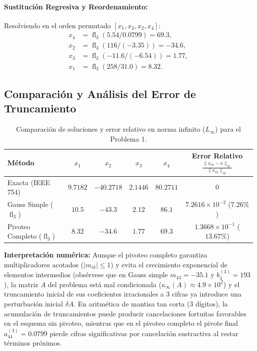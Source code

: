 \documentclass[11pt,letterpaper]{article}
\begin{document}
\paragraph{Sustitución Regresiva y Reordenamiento:}
Resolviendo en el orden permutado $[x_1, x_3, x_2, x_4]$:
\begin{align*}
    x_4 &= \operatorname{fl}_3(5.54 / 0.0799) = 69.3, \\
    x_2 &= \operatorname{fl}_3(116 / (-3.35)) = -34.6, \\
    x_3 &= \operatorname{fl}_3(-11.6 / (-6.54)) = 1.77, \\
    x_1 &= \operatorname{fl}_3(258 / 31.0) = 8.32.
\end{align*}

\subsection{Comparación y Análisis del Error de Truncamiento}

\begin{table}[H]
    \centering
    \caption{Comparación de soluciones y error relativo en norma infinito ($L_\infty$) para el Problema 1.}
    \label{tab:p1_comparacion}
    \begin{tabular}{lccccc}
        \toprule
        Método & $x_1$ & $x_2$ & $x_3$ & $x_4$ & Error Relativo $\frac{\|x_{\text{ex}} - x\|_\infty}{\|x_{\text{ex}}\|_\infty}$ \\
        \midrule
        Exacta (IEEE 754) & $9.7182$ & $-40.2718$ & $2.1446$ & $80.2711$ & $0$ \\
        Gauss Simple ($\operatorname{fl}_3$) & $10.5$ & $-43.3$ & $2.12$ & $86.1$ & $7.2616 \times 10^{-2}$ ($7.26\%$) \\
        Pivoteo Completo ($\operatorname{fl}_3$) & $8.32$ & $-34.6$ & $1.77$ & $69.3$ & $1.3668 \times 10^{-1}$ ($13.67\%$) \\
        \bottomrule
    \end{tabular}
\end{table}

\textbf{Interpretación numérica:} Aunque el pivoteo completo garantiza multiplicadores acotados ($|m_{ik}| \le 1$) y evita el crecimiento exponencial de elementos intermedios (obsérvese que en Gauss simple $m_{43} = -35.1$ y $b_4^{(3)} = 193$), la matriz $A$ del problema está mal condicionada ($\kappa_\infty(A) \approx 4.9 \times 10^2$) y el truncamiento inicial de sus coeficientes irracionales a $3$ cifras ya introduce una perturbación inicial $\delta A$. En aritmética de mantisa tan corta ($3$ dígitos), la acumulación de truncamientos puede producir cancelaciones fortuitas favorables en el esquema sin pivoteo, mientras que en el pivoteo completo el pivote final $a_{44}^{(3)} = 0.0799$ pierde cifras significativas por cancelación sustractiva al restar términos próximos.
\end{document}
